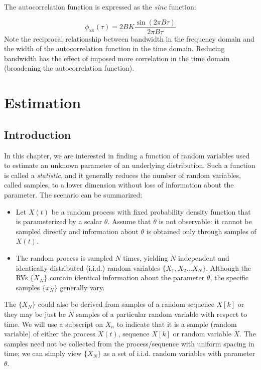 \documentclass[12pt]{book}
\theoremstyle{definition}
\begin{document}
The autocorrelation function is expressed as the \emph{sinc} function:

\[
\phi_\mathrm{xx} (\tau) = 2BK\frac{\sin(2 \pi B \tau)}{2 \pi B \tau }
\]
Note the reciprocal relationship between bandwidth in the frequency domain and the width of the autocorrelation function in the time domain. Reducing bandwidth has the effect of imposed more correlation in the time domain (broadening the autocorrelation function).   





\chapter{Estimation}

\section{Introduction}
In this chapter, we are interested in finding a function of random  variables used to estimate an unknown parameter of an underlying  distribution. Such a function is called a \emph{statistic}, and it generally reduces the number of random variables, called samples, to a lower dimension without loss of information about the parameter. The scenario can be summarized:

\begin{itemize}
    \item Let \(X(t)\) be a random process with fixed probability density function that is parameterized by a scalar \(\theta\). Assume that \(\theta\) is not observable: it cannot be sampled directly and information about \(\theta\) is obtained only through samples of \(X(t)\).
    \item The random process is sampled \(N\) times, yielding \(N\) independent and identically distributed (i.i.d.) random variables \(\{X_1, X_2 \ldots X_N\}\). Although the RVs \(\{X_N\}\) contain identical information about the parameter \(\theta\), the specific samples \(\{x_N\}\) generally vary.
    
\end{itemize}

The \(\{X_N\}\) could also be derived from samples of a random sequence \(X[k]\) or they may be just be \(N\) samples of a particular random variable with respect to time. We will use a subscript on \(X_n\) to indicate that it is a sample (random variable) of either the process \(X(t)\), sequence \(X[k]\) or random variable \(X\). The samples need not be collected from the process/sequence with uniform spacing in time; we can simply view \(\{X_N\}\) as a set of i.i.d. random variables with parameter \(\theta\).\\
\end{document}
